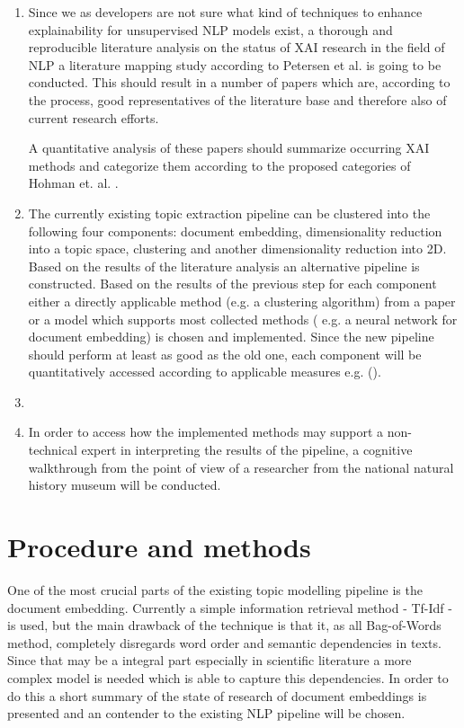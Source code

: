 \documentclass[pdftex,a4paper,12pt]{scrartcl}
\begin{document}
\begin{enumerate}
	\item Since we as developers are not sure what kind of techniques to enhance explainability for unsupervised NLP models exist, a thorough and reproducible literature analysis on the status of XAI research in the field of NLP a literature mapping study according to Petersen et al. \cite{petersenSystematicMappingStudies2008} is going to be conducted. This should result in a number of papers which are, according to the process, good representatives of the literature base and therefore also of current research efforts. 
	
	A quantitative analysis of these papers should summarize occurring XAI methods and categorize them according to the proposed categories of Hohman et. al. \cite{hohmanGamutDesignProbe2019}.
	
	\item The currently existing topic extraction pipeline can be clustered into the following four components: document embedding, dimensionality reduction into a topic space, clustering and another dimensionality reduction into 2D. Based on the results of the literature analysis an alternative pipeline is constructed. Based on the results of the previous step for each component either a directly applicable method (e.g. a clustering algorithm) from a paper or a model which supports most collected methods ( e.g. a neural network for document embedding) is chosen and implemented. Since the new pipeline should perform at least as good as the old one, each component will be quantitatively accessed according to applicable measures e.g. (\cite{roderExploringSpaceTopic2015a}).
	
	\item 
	
	\item In order to access how the implemented methods may support a non-technical expert in interpreting the results of the pipeline, a cognitive walkthrough from the point of view of a researcher from the national natural history museum will be conducted.
\end{enumerate}



\section{Procedure and methods}

One of the most crucial parts of the existing topic modelling pipeline is the document embedding. Currently a simple information retrieval method - Tf-Idf - is used, but the main drawback of the technique is that it, as all Bag-of-Words method, completely disregards word order and semantic dependencies in texts. Since that may be a integral part especially in scientific literature a more complex model is needed which is able to capture this dependencies. In order to do this a short summary of the state of research of document embeddings is presented and an contender to the existing NLP pipeline will be chosen. 
\end{document}
